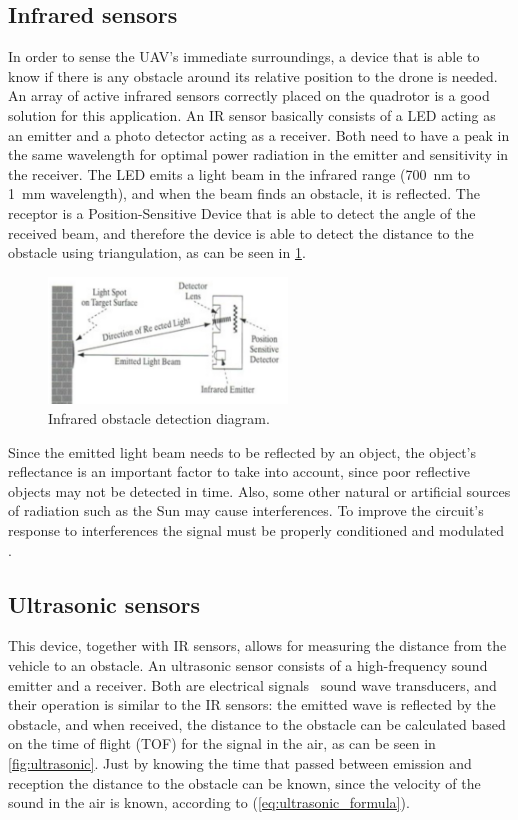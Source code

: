 \documentclass[journal, twoside]{IEEEtran}
\begin{document}
	\subsection{Infrared sensors}
	In order to sense the UAV's immediate surroundings, a device that is able to know if there is any obstacle around its relative position to the drone is needed. An array of active infrared sensors correctly placed on the quadrotor is a good solution for this application. An IR sensor basically consists of a LED acting as an emitter and a photo detector acting as a receiver. Both need to have a peak in the same wavelength for optimal power radiation in the emitter and sensitivity in the receiver. The LED emits a light beam in the infrared range (\SI{700}{\nano \meter} to \SI{1}{\milli \meter} wavelength), and when the beam finds an obstacle, it is reflected. The receptor is a Position-Sensitive Device that is able to detect the angle of the received beam, and therefore the device is able to detect the distance to the obstacle using triangulation, as can be seen in \figurename{ \ref{fig:ir}}.
	\begin{figure}[H]
		\centering
		\includegraphics[width=2.5in]{ir}
		\caption{Infrared obstacle detection diagram.}
		\label{fig:ir}
	\end{figure}
	Since the emitted light beam needs to be reflected by an object, the object's reflectance is an important factor to take into account, since poor reflective objects may not be detected in time.  Also, some other natural or artificial sources of radiation such as the Sun may cause interferences. To improve the circuit's response to interferences the signal must be properly conditioned and modulated \cite{mod_control_bresciani, remotecontrol}.
	
	\subsection{Ultrasonic sensors}
	This device, together with IR sensors, allows for measuring the distance from the vehicle to an obstacle. An ultrasonic sensor consists of a high-frequency sound emitter and a receiver. Both are electrical signals \textendash \ sound wave transducers, and their operation is similar to the IR sensors: the emitted wave is reflected by the obstacle, and when received, the distance to the obstacle can be calculated based on the time of flight (TOF) for the signal in the air, as can be seen in \figurename{} \ref{fig:ultrasonic}. Just by knowing the time that passed between emission and reception the distance to the obstacle can be known, since the velocity of the sound in the air is known, according to (\ref{eq:ultrasonic_formula}). 
	
\end{document}
